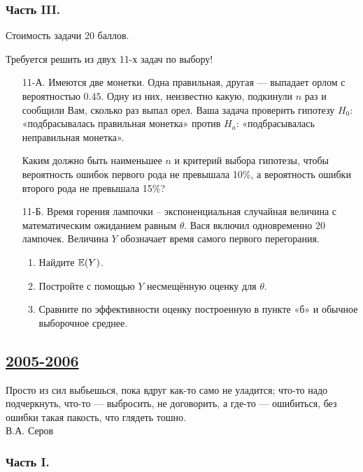 \subsubsection*{Часть III.}

Стоимость задачи 20 баллов.

Требуется решить \textbf{} из двух 11-х задач по
выбору!

\begin{enumerate}
\item[11-А.] Имеются две монетки. Одна правильная, другая — выпадает орлом с
вероятностью $0.45$. Одну из них, неизвестно какую, подкинули $n$
раз и сообщили Вам, сколько раз выпал орел. Ваша задача проверить
гипотезу $H_{0}$: «подбрасывалась правильная монетка» против
$H_{a}$:
«подбрасывалась неправильная монетка».

Каким должно быть наименьшее $n$ и критерий выбора гипотезы, чтобы
вероятность ошибок первого рода не превышала 10\%, а вероятность
ошибки второго рода не превышала 15\%?

\item[11-Б.] Время горения лампочки – экспоненциальная случайная величина с
математическим ожиданием равным $\theta $. Вася включил
одновременно 20 лампочек. Величина  $Y$ обозначает время самого
первого перегорания.
\begin{enumerate}
\item Найдите $\operatorname{\mathbb{E}}(Y)$.
\item Постройте с помощью  $Y$ несмещённую оценку для  $\theta$.
\item Сравните по эффективности оценку построенную в пункте
«б» и обычное выборочное среднее.
\end{enumerate}
\end{enumerate}


\subsection[2005-2006]{\hyperref[sec:sol_kr_03_2005_2006]{2005-2006}}
\label{sec:kr_03_2005_2006}



Просто из сил выбьешься, пока вдруг как-то само не уладится;
что-то надо подчеркнуть, что-то — выбросить, не договорить, а
где-то — ошибиться, без ошибки такая пакость, что глядеть тошно. \\
В.А. Серов \\

\subsubsection*{Часть I.}

